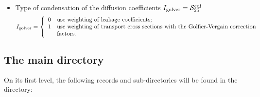 \begin{itemize}
\item Type of condensation of the diffusion coefficients $I_{\rm golver}=\mathcal{S}^{\rm edi}_{25}$
\begin{displaymath}
I_{\rm golver} = \left\{
\begin{array}{ll}
0 & \textrm{use weighting of leakage coefficients;} \\
1 & \textrm{use weighting of transport cross sections with the Golfier-Vergain correction} \\
 & \textrm{factors.} \\
\end{array} \right.
\end{displaymath}

\end{itemize}

\subsection{The main  directory}\label{sect:editiondirmain}

On its first level, the
following records and sub-directories will be found in the  directory:

